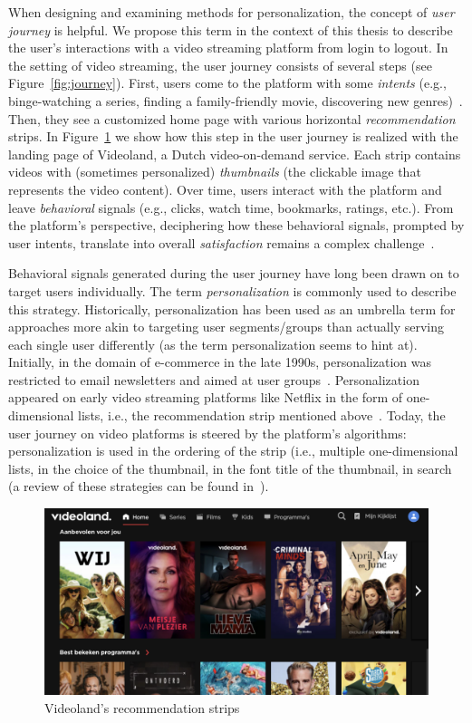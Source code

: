 When designing and examining methods for personalization, the concept of \emph{user journey} is helpful. 
We propose this term in the context of this thesis to describe the user's interactions with a video streaming platform from login to logout.
In the setting of video streaming, the user journey consists of several steps (see Figure~\ref{fig:journey}).
First, users come to the platform with some \emph{intents} (e.g., binge-watching a series, finding a family-friendly movie, discovering new genres)~\cite{intent}. 
Then, they see a customized home page with various horizontal \emph{recommendation} strips.
In Figure~\ref{fig:VLStrip} we show how this step in the user journey is realized with the landing page of Videoland, a Dutch video-on-demand service. 
Each strip contains videos with (sometimes personalized) \emph{thumbnails} (the clickable image that represents the video content). 
Over time, users interact with the platform and leave \emph{behavioral} signals (e.g., clicks, watch time, bookmarks, ratings, etc.). 
From the platform's perspective, deciphering how these behavioral signals, prompted by user intents, translate into overall \emph{satisfaction} remains a complex challenge~\cite{spotifyIntent}.

Behavioral signals generated during the user journey have long been drawn on to target users individually. 
The term \emph{personalization} is commonly used to describe this strategy. 
Historically, personalization has been used as an umbrella term for approaches more akin to targeting user segments/groups than actually serving each single user differently (as the term personalization seems to hint at). 
Initially, in the domain of e-commerce in the late 1990s, personalization was restricted to email newsletters and aimed at user groups~\cite{oldReco}. 
Personalization appeared on early video streaming platforms like Netflix in the form of one-dimensional lists, i.e.,  the recommendation strip mentioned above~\cite{oldReco}. 
Today, the user journey on video platforms is steered by the platform's algorithms: personalization is used in the ordering of the strip (i.e., multiple one-dimensional lists, in the choice of the thumbnail, in the font title of the thumbnail, in search (a review of these strategies can be found in~\cite{NetflixReco}).

\begin{figure}[t]
  \centering
  \includegraphics[width=\textwidth]{images/VLHome_cropped.png}
  \caption{Videoland's recommendation strips}
  \label{fig:VLStrip}
\end{figure}

